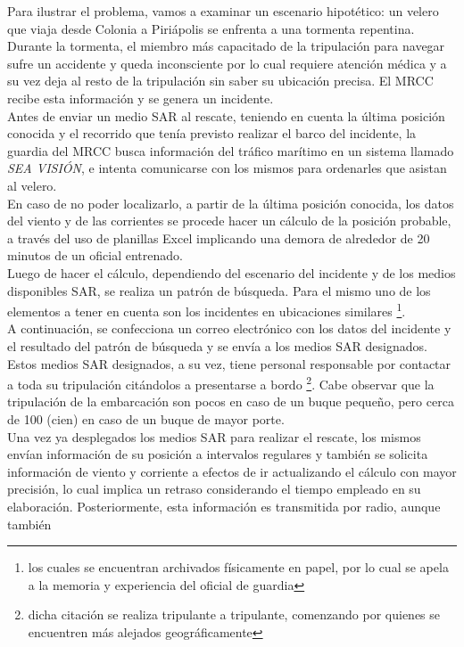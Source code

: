 Para ilustrar el problema, vamos a examinar un escenario hipotético: un velero que viaja desde Colonia a Piriápolis se 
enfrenta a una tormenta repentina. Durante la tormenta, el miembro más capacitado de la tripulación para navegar sufre un 
accidente y queda inconsciente por lo cual requiere atención médica y a su vez deja al resto de la tripulación sin saber su 
ubicación precisa. El MRCC recibe esta información y se genera un incidente.\\
Antes de enviar un medio SAR al rescate, teniendo en cuenta la última posición conocida y el recorrido que tenía previsto realizar 
el barco del incidente, la guardia del MRCC busca información del tráfico marítimo en un sistema llamado \textit{SEA VISIÓN}, 
e intenta comunicarse con los mismos para ordenarles que asistan al velero.\\
En caso de no poder localizarlo, a partir de la última posición conocida, los datos del viento y de las corrientes se procede hacer un 
cálculo de la posición probable, a través del uso de planillas Excel implicando una demora de alrededor de 20 minutos de un oficial 
entrenado.\\
Luego de hacer el cálculo, dependiendo del escenario del incidente y de los medios disponibles SAR, se realiza un patrón de búsqueda. 
Para el mismo uno de los elementos a tener en cuenta son los incidentes en ubicaciones similares \footnote{los cuales se encuentran archivados 
físicamente en papel, por lo cual se apela a la memoria y experiencia del oficial de guardia}.\\
A continuación, se confecciona un correo electrónico con los datos del incidente y el resultado del patrón de búsqueda y se envía a los medios SAR 
designados. Estos medios SAR designados, a su vez, tiene personal responsable por contactar a toda su tripulación citándolos a presentarse a bordo 
\footnote{dicha citación se realiza tripulante a tripulante, comenzando por quienes se encuentren más alejados geográficamente}. 
Cabe observar que la tripulación de la embarcación son pocos en caso de un buque pequeño, pero cerca de 100 (cien) en caso de un buque de mayor 
porte.\\
Una vez ya desplegados los medios SAR para realizar el rescate, los mismos envían información de su posición a intervalos regulares y también
se solicita información de viento y corriente a efectos de ir actualizando el cálculo con mayor precisión, lo cual implica un retraso  
considerando el tiempo empleado en su elaboración. Posteriormente, esta información es transmitida por radio, aunque también
